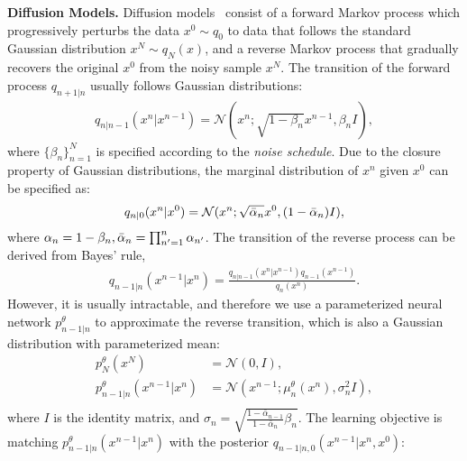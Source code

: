 \textbf{Diffusion Models. }Diffusion models~\citep{ddpm,diffusion_sde} consist of a forward Markov process which progressively perturbs the data $x^0\sim q_0$ to data that follows the standard Gaussian distribution $x^N\sim q_N(x)$, and a reverse Markov process that gradually recovers the original $x^0$ from the noisy sample $x^N$. The transition of the forward process $q_{n+1|n}$ usually follows Gaussian distributions:
\begin{equation}
    \begin{aligned}
        q_{n|n-1}(x^{n}|x^{n-1})=\mathcal{N}(x^{n}; \sqrt{1-\beta_{n}}x^{n-1}, \beta_{n}I),
    \end{aligned}
\end{equation}
where $\{\beta_{n}\}_{n=1}^N$ is specified according to the \textit{noise schedule}. Due to the closure property of Gaussian distributions, the marginal distribution of $x^n$ given $x^0$ can be specified as:
\begin{equation}
    \begin{aligned}
        q_{n|0}(x^n|x^0)=\mathcal{N}(x^n; \sqrt{\bar{\alpha}_n}x^0, (1-\bar{\alpha}_n)I),
    \end{aligned}
\end{equation}
where $\alpha_n=1-\beta_n, \bar{\alpha}_n=\prod_{n'=1}^n \alpha_{n'}$. The transition of the reverse process can be derived from Bayes' rule, 
\begin{equation}
    \begin{aligned}
        q_{n-1|n}(x^{n-1}|x^{n})=\frac{q_{n|n-1}(x^{n}|x^{n-1})q_{n-1}(x^{n-1})}{q_{n}(x^{n})}.
    \end{aligned}
\end{equation}
However, it is usually intractable, and therefore we use a parameterized neural network $p^\theta_{n-1|n}$ to approximate the reverse transition, which is also a Gaussian distribution with parameterized mean:
\begin{equation}\label{eq:reverse_diff}
    \begin{aligned}
        p^\theta_N(x^N)&=\mathcal{N}(0, I),\\
        p^\theta_{n-1|n}(x^{n-1}|x^{n})&=\mathcal{N}(x^{n-1}; \mu^\theta_{n}(x^{n}), \sigma^2_{n}I),\\
    \end{aligned}
\end{equation}
where $I$ is the identity matrix, and $\sigma_n=\sqrt{\frac{1-\bar{\alpha}_{n-1}}{1-\bar{\alpha}_n}\beta_n}$. The learning objective is matching $p^\theta_{n-1|n}(x^{n-1}|x^{n})$ with the posterior $q_{n-1|n,0}(x^{n-1}|x^{n},x^0)$:
